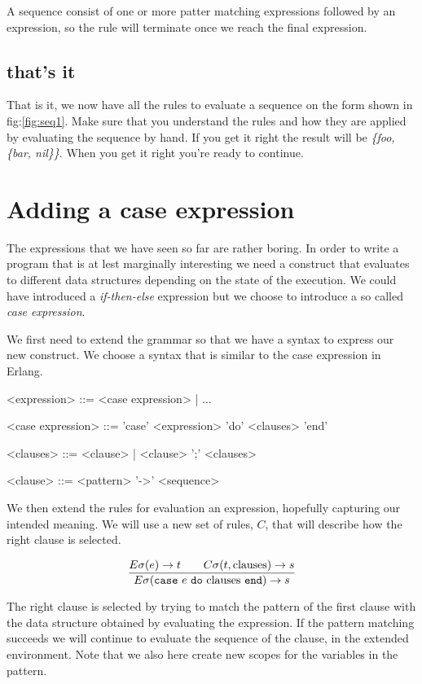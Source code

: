 \documentclass[a4paper,11pt]{article}
\begin{document}
A sequence consist of one or more patter matching expressions
followed by an expression, so the rule will terminate once we reach
the final expression.

\subsection{that's it}

That is it, we now have all the rules to evaluate a sequence on the
form shown in fig:\ref{fig:seq1}. Make sure that you understand
the rules and how they are applied by evaluating the sequence by
hand. If you get it right the result will be {\em \{foo, \{bar,
  nil\}\}}. When you get it right you're ready to continue.


\section{Adding a case expression}

The expressions that we have seen so far are rather boring. In order to
write a program that is at lest marginally interesting we need a
construct that evaluates to different data structures depending on the
state of the execution. We could have introduced a {\em if-then-else}
expression but we choose to introduce a so called {\em case expression}.

We first need to extend the grammar so that we have a syntax to express
our new construct. We choose a syntax that is similar to the case
expression in Erlang.

\begin{grammar}
     <expression> ::=  <case expression> | ...  

     <case expression> ::= 'case' <expression> 'do' <clauses>  'end' 

     <clauses> ::=   <clause> | <clause> ';' <clauses>

     <clause> ::=  <pattern> '-\textgreater' <sequence>
\end{grammar}

We then extend the rules for evaluation an expression, hopefully
capturing our intended meaning. We will use a new set of rules, $C$,
that will describe how the right clause is selected. 


$$\frac{E\sigma(e) \rightarrow t \qquad C\sigma(t, {\rm clauses}) \rightarrow s }{E\sigma({\tt case}\ e \ {\tt do}\ {\rm clauses} \ {\tt end}) \rightarrow s}$$

The right clause is selected by trying to match the pattern of the
first clause with the data structure obtained by evaluating the
expression. If the pattern matching succeeds we will continue to
evaluate the sequence of the clause, in the extended environment. Note
that we also here create new scopes for the variables in the pattern.
\end{document}
